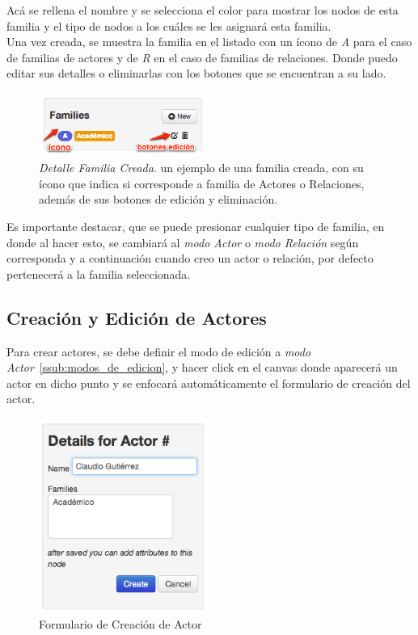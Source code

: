 Acá se rellena el nombre y se selecciona el color para mostrar los nodos de esta familia y el tipo de nodos a los cuáles se les asignará esta familia.\\

Una vez creada, se muestra la familia en el listado con un ícono de \emph{A} para el caso de familias de actores y de \emph{R} en el caso de familias de relaciones. Donde puedo editar sus detalles o eliminarlas con los botones que se encuentran a su lado.

\begin{figure}[H]
  \centering
  \includegraphics[width=0.5\textwidth]{images/familia_creada.png}
  \caption[Detalle Familia Creada]{\emph{Detalle Familia Creada}. un ejemplo de una familia creada, con su ícono que indica si corresponde a familia de Actores o Relaciones, además de sus botones de edición y eliminación.}
  \label{familia_creada}
\end{figure}

Es importante destacar, que se puede presionar cualquier tipo de familia, en donde al hacer esto, se cambiará al \emph{modo Actor} o \emph{modo Relación} según corresponda y a continuación cuando creo un actor o relación, por defecto pertenecerá a la familia seleccionada.


\subsection{Creación y Edición de Actores} %
\label{sub:creacion_y_edicion_de_actores}

Para crear actores, se debe definir el modo de edición a \emph{modo Actor}~\ref{ssub:modos_de_edicion}, y hacer click en el canvas donde aparecerá un actor en dicho punto y se enfocará automáticamente el formulario de creación del actor.\\

\begin{figure}[H]
  \centering
  \includegraphics[width=0.5\textwidth]{images/creacion_actor.png}
  \caption{Formulario de Creación de Actor}
  \label{creacion_actor}
\end{figure}

